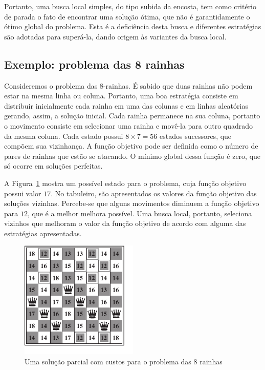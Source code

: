Portanto, uma busca local simples, do tipo subida da encosta, tem como critério de parada o fato de encontrar uma solução ótima, que não é garantidamente o ótimo global do problema. Esta é a deficiência desta busca e diferentes estratégias são adotadas para superá-la, dando origem às variantes da busca local.

\subsection{Exemplo: problema das 8 rainhas}

Consideremos o problema das 8-rainhas. É sabido que duas rainhas não podem estar na mesma linha ou coluna. Portanto, uma boa estratégia consiste em distribuir inicialmente cada rainha em uma das colunas e em linhas aleatórias gerando, assim, a solução inicial. Cada rainha permanece na sua coluna, portanto o movimento consiste em selecionar uma rainha e movê-la para outro quadrado da mesma coluna. Cada estado possui $8 \times 7 = 56$ estados sucessores, que compõem sua vizinhança. A função objetivo pode ser definida como o número de pares de rainhas que estão se atacando. O mínimo global dessa função é zero, que só ocorre em soluções perfeitas.

A Figura~\ref{fig:busca-local-oito-rainhas} mostra um possível estado para o problema, cuja função objetivo possui valor $17$. No tabuleiro, são apresentados os valores da função objetivo das soluções vizinhas. Percebe-se que alguns movimentos diminuem a função objetivo para $12$, que é a melhor melhora possível. Uma busca local, portanto, seleciona vizinhos que melhoram o valor da função objetivo de acordo com alguma das estratégias apresentadas.

\begin{figure}[h]
	\centering
	\hspace{15pt}
	\includegraphics[width=0.5\textwidth]{img/busca-local-oito-rainhas}
	\caption{Uma solução parcial com custos para o problema das 8 rainhas}
	\label{fig:busca-local-oito-rainhas}
\end{figure}

